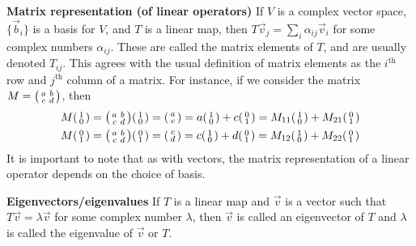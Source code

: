 \documentclass{article}
\begin{document}
\textbf{Matrix representation (of linear operators)}
If $V$ is a complex vector space, $\{\vec b_i\}$ is a basis for $V$, and $T$ is a linear map, then $T\vec v_j = \sum_{i}\alpha_{ij}\vec v_i$ for some complex numbers $\alpha_{ij}$. These are called the matrix elements of $T$, and are usually denoted $T_{ij}$. This agrees with the usual definition of matrix elements as the $i^\text{th}$ row and $j^{\text{th}}$ column of a matrix. For instance, if we consider the matrix $M = \smqty(a & b \\ c & d)$, then
\begin{align}
M\smqty(1 \\ 0) &= \smqty(a & b \\ c & d)\smqty(1 \\ 0) = \smqty(a \\ c) = a\smqty(1 \\ 0) + c \smqty(0 \\ 1) = M_{11}\smqty(1 \\ 0) + M_{21}\smqty(0 \\ 1) \\
M\smqty(0 \\ 1) &= \smqty(a & b \\ c & d)\smqty(0 \\ 1) = \smqty(c \\ d) = c\smqty(1 \\ 0) + d \smqty(0 \\ 1) = M_{12}\smqty(1 \\ 0) + M_{22}\smqty(0 \\ 1)
\end{align}
It is important to note that as with vectors, the matrix representation of a linear operator depends on the choice of basis.

\textbf{Eigenvectors/eigenvalues}
If $T$ is a linear map and $\vec v$ is a vector such that $T \vec v = \lambda \vec v$ for some complex number $\lambda$, then $\vec v$ is called an eigenvector of $T$ and $\lambda$ is called the eigenvalue of $\vec v$ or $T$.
\end{document}

